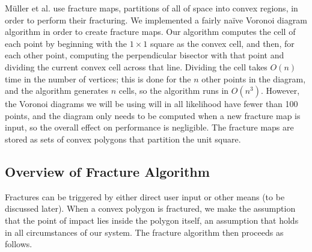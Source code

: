 \documentclass[tog]{acmsiggraph}
\begin{document}
M\"uller et al. use fracture maps, partitions of all of space into
convex regions, in order to perform their fracturing. We implemented a
fairly na\"ive Voronoi diagram algorithm in order to create fracture
maps. Our algorithm computes the cell of each point by beginning with
the $1 \times 1$ square as the convex cell, and then, for each other
point, computing the perpendicular bisector with that point and
dividing the current convex cell across that line. Dividing the cell
takes $O(n)$ time in the number of vertices; this is done for the $n$
other points in the diagram, and the algorithm generates $n$ cells, so
the algorithm runs in $O(n^3)$. However, the Voronoi diagrams we will
be using will in all likelihood have fewer than 100 points, and the
diagram only needs to be computed when a new fracture map is input, so
the overall effect on performance is negligible. The fracture maps are
stored as sets of convex polygons that partition the unit square.

\subsection{Overview of Fracture Algorithm}

Fractures can be triggered by either direct user input or other means
(to be discussed later). When a convex polygon is fractured, we make
the assumption that the point of impact lies inside the polygon
itself, an assumption that holds in all circumstances of our system.
The fracture algorithm then proceeds as follows.
\end{document}
